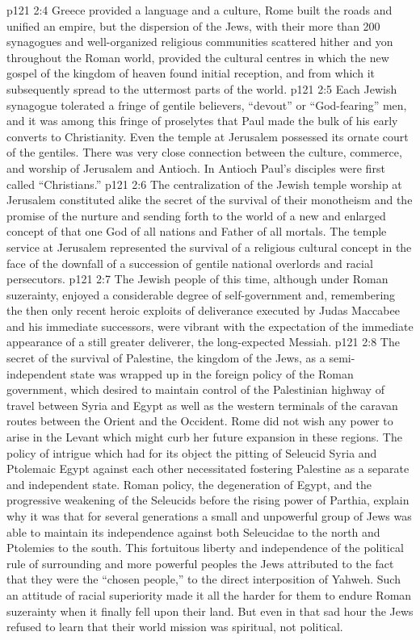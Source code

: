 \vs p121 2:4 Greece provided a language and a culture, Rome built the roads and unified an empire, but the dispersion of the Jews, with their more than 200 synagogues and well\hyp{}organized religious communities scattered hither and yon throughout the Roman world, provided the cultural centres in which the new gospel of the kingdom of heaven found initial reception, and from which it subsequently spread to the uttermost parts of the world.
\vs p121 2:5 Each Jewish synagogue tolerated a fringe of gentile believers, “devout” or “God\hyp{}fearing” men, and it was among this fringe of proselytes that Paul made the bulk of his early converts to Christianity. Even the temple at Jerusalem possessed its ornate court of the gentiles. There was very close connection between the culture, commerce, and worship of Jerusalem and Antioch. In Antioch Paul’s disciples were first called “Christians.”
\vs p121 2:6 The centralization of the Jewish temple worship at Jerusalem constituted alike the secret of the survival of their monotheism and the promise of the nurture and sending forth to the world of a new and enlarged concept of that one God of all nations and Father of all mortals. The temple service at Jerusalem represented the survival of a religious cultural concept in the face of the downfall of a succession of gentile national overlords and racial persecutors.
\vs p121 2:7 \pc The Jewish people of this time, although under Roman suzerainty, enjoyed a considerable degree of self\hyp{}government and, remembering the then only recent heroic exploits of deliverance executed by Judas Maccabee and his immediate successors, were vibrant with the expectation of the immediate appearance of a still greater deliverer, the long\hyp{}expected Messiah.
\vs p121 2:8 The secret of the survival of Palestine, the kingdom of the Jews, as a semi\hyp{}independent state was wrapped up in the foreign policy of the Roman government, which desired to maintain control of the Palestinian highway of travel between Syria and Egypt as well as the western terminals of the caravan routes between the Orient and the Occident. Rome did not wish any power to arise in the Levant which might curb her future expansion in these regions. The policy of intrigue which had for its object the pitting of Seleucid Syria and Ptolemaic Egypt against each other necessitated fostering Palestine as a separate and independent state. Roman policy, the degeneration of Egypt, and the progressive weakening of the Seleucids before the rising power of Parthia, explain why it was that for several generations a small and unpowerful group of Jews was able to maintain its independence against both Seleucidae to the north and Ptolemies to the south. This fortuitous liberty and independence of the political rule of surrounding and more powerful peoples the Jews attributed to the fact that they were the “chosen people,” to the direct interposition of Yahweh. Such an attitude of racial superiority made it all the harder for them to endure Roman suzerainty when it finally fell upon their land. But even in that sad hour the Jews refused to learn that their world mission was spiritual, not political.
